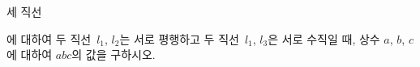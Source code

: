 세 직선 \par\smallskip{}\par\smallskip{}\par\smallskip{}\par\smallskip\noindent 에 대하여 두 직선~$l_1$, $l_2$는 서로 평행하고 두 직선~$l_1$, $l_3$은 서로 수직일 때, 상수 $a$, $b$, $c$에 대하여 $abc$의 값을 구하시오.
